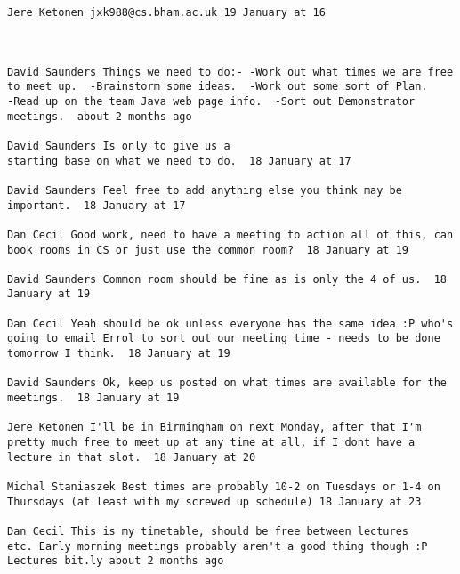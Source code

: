 \begin{verbatim}
Jere Ketonen jxk988@cs.bham.ac.uk 19 January at 16



David Saunders Things we need to do:- -Work out what times we are free
to meet up.  -Brainstorm some ideas.  -Work out some sort of Plan.
-Read up on the team Java web page info.  -Sort out Demonstrator
meetings.  about 2 months ago 

David Saunders Is only to give us a
starting base on what we need to do.  18 January at 17

David Saunders Feel free to add anything else you think may be
important.  18 January at 17

Dan Cecil Good work, need to have a meeting to action all of this, can
book rooms in CS or just use the common room?  18 January at 19

David Saunders Common room should be fine as is only the 4 of us.  18
January at 19

Dan Cecil Yeah should be ok unless everyone has the same idea :P who's
going to email Errol to sort out our meeting time - needs to be done
tomorrow I think.  18 January at 19

David Saunders Ok, keep us posted on what times are available for the
meetings.  18 January at 19

Jere Ketonen I'll be in Birmingham on next Monday, after that I'm
pretty much free to meet up at any time at all, if I dont have a
lecture in that slot.  18 January at 20

Michal Staniaszek Best times are probably 10-2 on Tuesdays or 1-4 on
Thursdays (at least with my screwed up schedule) 18 January at 23

Dan Cecil This is my timetable, should be free between lectures
etc. Early morning meetings probably aren't a good thing though :P
Lectures bit.ly about 2 months ago
\end{verbatim}